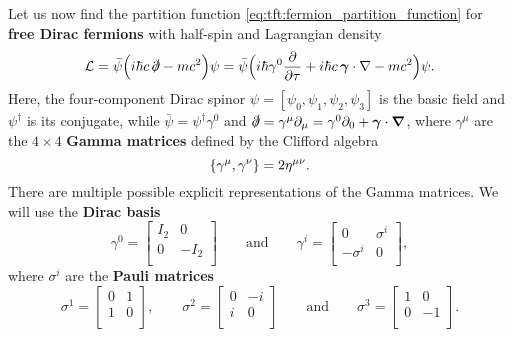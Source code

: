 Let us now find the partition function \eqref{eq:tft:fermion_partition_function} for \textbf{free Dirac fermions} with half-spin and Lagrangian density
\begin{equation}
	\lagr = \bar\psi \Big( i \hbar c \, \slashed\partial - m c^2 \Big) \psi
	      = \bar\psi \Big( i \hbar \gamma^0 \pdv{}{\tau} + i \hbar c \, \vec{\gamma} \cdot \nabla - m c^2 \Big) \psi .
\label{eq:tft:dirac_lagrangian}
\end{equation}
Here, the four-component Dirac spinor $\psi = [ \psi_0, \psi_1, \psi_2, \psi_3 ] $ is the basic field and $\psi^\dagger$ is its conjugate, while $\bar\psi = \psi^\dagger \gamma^0$ and $\slashed\partial = \gamma^\mu \partial_\mu = \gamma^0 \partial_0 + \vec{\gamma} \cdot \vec{\nabla}$, where $\gamma^\mu$ are the $4 \times 4$ \textbf{Gamma matrices} defined by the Clifford algebra
\begin{equation}
	\acomm{\gamma^\mu}{\gamma^\nu} = 2 \eta^{\mu \nu} .
\end{equation}
There are multiple possible explicit representations of the Gamma matrices.
We will use the \textbf{Dirac basis}
\begin{equation}
	\gamma^0 = \begin{bmatrix} I_2 & 0 \\ 0 & -I_2 \\ \end{bmatrix}
	\qquad \text{and} \qquad
	\gamma^i = \begin{bmatrix} 0 & \sigma^i \\ -\sigma^i & 0 \\ \end{bmatrix} ,
\label{eq:tft:gamma_dirac_basis}
\end{equation}
where $\sigma^i$ are the \textbf{Pauli matrices}
\begin{equation}
	\sigma^1 = \begin{bmatrix} 0 & 1 \\ 1 & 0 \\ \end{bmatrix} ,
	\qquad
	\sigma^2 = \begin{bmatrix} 0 & -i \\ i & 0 \\ \end{bmatrix}
	\qquad \text{and} \qquad
	\sigma^3 = \begin{bmatrix} 1 & 0 \\ 0 & -1 \\ \end{bmatrix} .
\label{eq:tft:pauli_matrices}
\end{equation}

